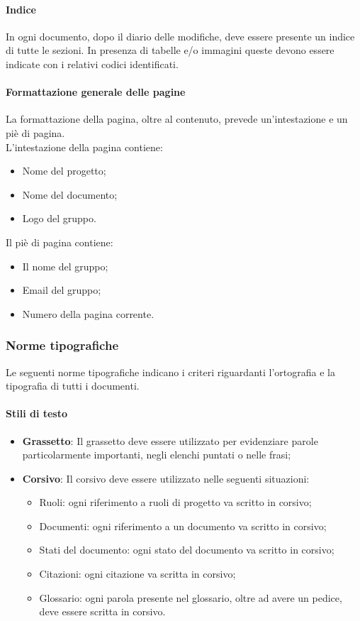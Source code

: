 \paragraph{Indice}
In ogni documento, dopo il diario delle modifiche, deve essere presente un
indice di tutte le sezioni. In presenza di tabelle e/o immagini queste devono
essere indicate con i relativi codici identificati.

\paragraph{Formattazione generale delle pagine}
La formattazione della pagina, oltre al contenuto, prevede un'intestazione e un
piè di pagina. \\
L'intestazione della pagina contiene:
\begin{itemize}
  \item Nome del progetto;
  \item Nome del documento;
  \item Logo del gruppo.
\end{itemize}
Il piè di pagina contiene:
\begin{itemize}
  \item Il nome del gruppo;
  \item Email del gruppo;
  \item Numero della pagina corrente.
\end{itemize}

\subsubsection{Norme tipografiche}
Le seguenti norme tipografiche indicano i criteri riguardanti
l'ortografia e la tipografia di tutti i documenti.

\paragraph{Stili di testo}
\begin{itemize}
  \item \textbf{Grassetto}: Il grassetto deve essere utilizzato per evidenziare parole
  particolarmente importanti, negli elenchi puntati o nelle frasi;
  \item \textbf{Corsivo}: Il corsivo deve essere utilizzato nelle seguenti
  situazioni:
  \begin{itemize}
    \item Ruoli: ogni riferimento a ruoli di progetto va scritto in corsivo;
    \item Documenti: ogni riferimento a un documento va scritto in corsivo;
    \item Stati del documento: ogni stato del documento va scritto in corsivo;
    \item Citazioni: ogni citazione va scritta in corsivo;
    \item Glossario: ogni parola presente nel glossario, oltre ad avere un pedice, deve
    essere scritta in corsivo.
  \end{itemize}
\end{itemize}

